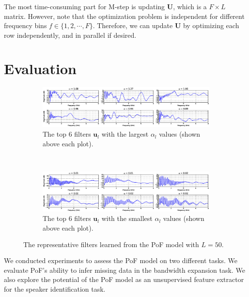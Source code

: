 \documentclass{article} %
\begin{document}
The most time-consuming part for M-step is updating $\mathbf{U}$,
which is a $F\times L$ matrix. However, note that the optimization
problem is independent for different frequency bins $f\in \{1, 2,
\cdots, F\}$. Therefore, we can update $\mathbf{U}$ by optimizing each
row independently, and in parallel if desired.

\section{Evaluation}

\begin{figure}
        \centering
        \begin{subfigure}[b]{1\textwidth}
                \includegraphics[width=\textwidth]{filters_L50}		
		\caption{The top 6 filters $\bm{u}_l$ with the largest $\alpha_l$ values (shown above each plot). }
		\label{fig:filters}
        \end{subfigure}%
       \\%
        \begin{subfigure}[b]{1\textwidth}
                \includegraphics[width=\textwidth]{sources_L50}
		\caption{The top 6 filters $\bm{u}_l$ with the smallest $\alpha_l$ values (shown above each plot). }
		\label{fig:sources}
        \end{subfigure}
        \caption{The representative filters learned from the PoF model with $L = 50$.}\label{fig:sf}
\end{figure}

We conducted experiments to assess the PoF model on two different tasks. We evaluate PoF's ability to infer missing data in the bandwidth expansion task. We also explore the potential of the PoF model as an unsupervised feature extractor for the speaker identification task. 
\end{document}
